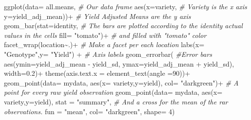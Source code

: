 \documentclass[
]{book}
\newenvironment{Shaded}{\begin{snugshade}}{\end{snugshade}}
\newcommand{\AttributeTok}[1]{\textcolor[rgb]{0.77,0.63,0.00}{#1}}
\newcommand{\CommentTok}[1]{\textcolor[rgb]{0.56,0.35,0.01}{\textit{#1}}}
\newcommand{\DecValTok}[1]{\textcolor[rgb]{0.00,0.00,0.81}{#1}}
\newcommand{\FloatTok}[1]{\textcolor[rgb]{0.00,0.00,0.81}{#1}}
\newcommand{\FunctionTok}[1]{\textcolor[rgb]{0.00,0.00,0.00}{#1}}
\newcommand{\NormalTok}[1]{#1}
\newcommand{\SpecialCharTok}[1]{\textcolor[rgb]{0.00,0.00,0.00}{#1}}
\newcommand{\StringTok}[1]{\textcolor[rgb]{0.31,0.60,0.02}{#1}}
\begin{document}
\begin{Shaded}
\begin{Highlighting}[]
\FunctionTok{ggplot}\NormalTok{(}\AttributeTok{data=}\NormalTok{ all.means,                     }\CommentTok{\# Our data frame}
       \FunctionTok{aes}\NormalTok{(}\AttributeTok{x=}\NormalTok{variety,                       }\CommentTok{\# Variety is the x axis}
           \AttributeTok{y=}\NormalTok{yield\_adj\_mean))}\SpecialCharTok{+}              \CommentTok{\# Yield Adjusted Means are the y axis}
  \FunctionTok{geom\_bar}\NormalTok{(}\AttributeTok{stat=}\StringTok{\textquotesingle{}identity\textquotesingle{}}\NormalTok{,                 }\CommentTok{\# The bars are plotted according to the identity actual values in the cells}
           \AttributeTok{fill=} \StringTok{"tomato"}\NormalTok{)}\SpecialCharTok{+}                 \CommentTok{\# and filled with "tomato" color}
  \FunctionTok{facet\_wrap}\NormalTok{(location}\SpecialCharTok{\textasciitilde{}}\NormalTok{.)}\SpecialCharTok{+}                        \CommentTok{\# Make a facet per each location }
  \FunctionTok{labs}\NormalTok{(}\AttributeTok{x=} \StringTok{"Genotype"}\NormalTok{,}\AttributeTok{y=} \StringTok{"Yield"}\NormalTok{)  }\SpecialCharTok{+}         \CommentTok{\# Axis labels}
  \FunctionTok{geom\_errorbar}\NormalTok{(                            }\CommentTok{\#Error bars}
          \FunctionTok{aes}\NormalTok{(}\AttributeTok{ymin=}\NormalTok{yield\_adj\_mean }\SpecialCharTok{{-}}\NormalTok{ yield\_sd, }
              \AttributeTok{ymax=}\NormalTok{yield\_adj\_mean }\SpecialCharTok{+}\NormalTok{ yield\_sd),}
              \AttributeTok{width=}\FloatTok{0.2}\NormalTok{)}\SpecialCharTok{+}
  \FunctionTok{theme}\NormalTok{(}\AttributeTok{axis.text.x =} \FunctionTok{element\_text}\NormalTok{(}\AttributeTok{angle =}\DecValTok{90}\NormalTok{))}\SpecialCharTok{+}
  \FunctionTok{geom\_point}\NormalTok{(}\AttributeTok{data=}\NormalTok{ mydata, }\FunctionTok{aes}\NormalTok{(}\AttributeTok{x=}\NormalTok{ variety,}\AttributeTok{y=}\NormalTok{yield), }\AttributeTok{col=} \StringTok{"darkgreen"}\NormalTok{)}\SpecialCharTok{+}   \CommentTok{\# A point for every raw yield observation}
  \FunctionTok{geom\_point}\NormalTok{(}\AttributeTok{data=}\NormalTok{ mydata, }\FunctionTok{aes}\NormalTok{(}\AttributeTok{x=}\NormalTok{ variety,}\AttributeTok{y=}\NormalTok{yield), }\AttributeTok{stat =} \StringTok{"summary"}\NormalTok{,    }\CommentTok{\# And a cross for the mean of the rar observations.}
             \AttributeTok{fun =} \StringTok{"mean"}\NormalTok{, }\AttributeTok{col=} \StringTok{"darkgreen"}\NormalTok{, }\AttributeTok{shape=} \DecValTok{4}\NormalTok{)}
\end{Highlighting}
\end{Shaded}
\end{document}
